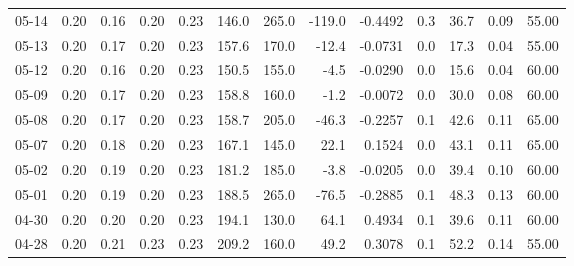 \begin{threeparttable}
{\begin{tabular}{lrrrrrrrrrrrr}
  05-14 &          0.20 &          0.16 &          0.20 &        0.23 &               146.0 &               265.0 &     -119.0 &      -0.4492 &                 0.3 &             36.7 &            0.09 &                  55.00 \\
  05-13 &          0.20 &          0.17 &          0.20 &        0.23 &               157.6 &               170.0 &      -12.4 &      -0.0731 &                 0.0 &             17.3 &            0.04 &                  55.00 \\
  05-12 &          0.20 &          0.16 &          0.20 &        0.23 &               150.5 &               155.0 &       -4.5 &      -0.0290 &                 0.0 &             15.6 &            0.04 &                  60.00 \\
  05-09 &          0.20 &          0.17 &          0.20 &        0.23 &               158.8 &               160.0 &       -1.2 &      -0.0072 &                 0.0 &             30.0 &            0.08 &                  60.00 \\
  05-08 &          0.20 &          0.17 &          0.20 &        0.23 &               158.7 &               205.0 &      -46.3 &      -0.2257 &                 0.1 &             42.6 &            0.11 &                  65.00 \\
  05-07 &          0.20 &          0.18 &          0.20 &        0.23 &               167.1 &               145.0 &       22.1 &       0.1524 &                 0.0 &             43.1 &            0.11 &                  65.00 \\
  05-02 &          0.20 &          0.19 &          0.20 &        0.23 &               181.2 &               185.0 &       -3.8 &      -0.0205 &                 0.0 &             39.4 &            0.10 &                  60.00 \\
  05-01 &          0.20 &          0.19 &          0.20 &        0.23 &               188.5 &               265.0 &      -76.5 &      -0.2885 &                 0.1 &             48.3 &            0.13 &                  60.00 \\
  04-30 &          0.20 &          0.20 &          0.20 &        0.23 &               194.1 &               130.0 &       64.1 &       0.4934 &                 0.1 &             39.6 &            0.11 &                  60.00 \\
  04-28 &          0.20 &          0.21 &          0.23 &        0.23 &               209.2 &               160.0 &       49.2 &       0.3078 &                 0.1 &             52.2 &            0.14 &                  55.00 \\

\end{tabular}}
\end{threeparttable}
